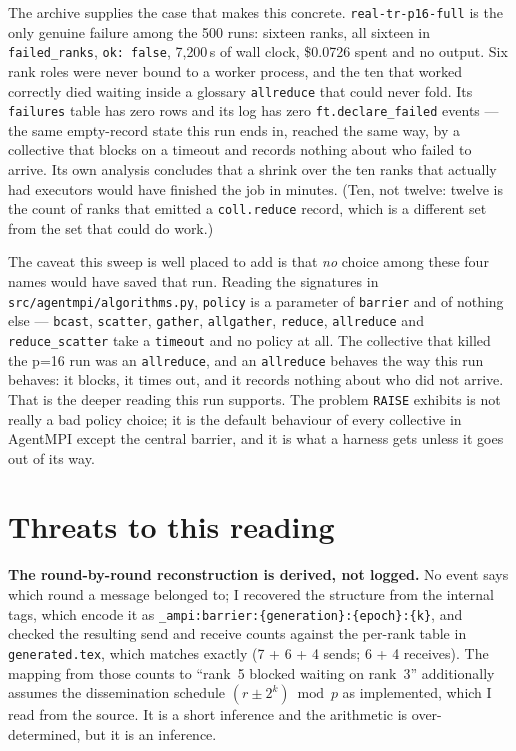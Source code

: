 \documentclass[11pt]{article}
\begin{document}
The archive supplies the case that makes this concrete. \texttt{real-tr-p16-full} is the
only genuine failure among the 500 runs: sixteen ranks, all sixteen in
\texttt{failed\_ranks}, \texttt{ok: false}, 7{,}200\,s of wall clock, \$0.0726 spent and
no output. Six rank roles were never bound to a worker process, and the ten that worked
correctly died waiting inside a glossary \texttt{allreduce} that could never fold. Its
\texttt{failures} table has zero rows and its log has zero \texttt{ft.declare\_failed}
events --- the same empty-record state this run ends in, reached the same way, by a
collective that blocks on a timeout and records nothing about who failed to arrive. Its
own analysis concludes that a shrink over the ten ranks that actually had executors would
have finished the job in minutes. (Ten, not twelve: twelve is the count of ranks that
emitted a \texttt{coll.reduce} record, which is a different set from the set that could do
work.)

The caveat this sweep is well placed to add is that \emph{no} choice among these four
names would have saved that run. Reading the signatures in
\texttt{src/agentmpi/algorithms.py}, \texttt{policy} is a parameter of \texttt{barrier}
and of nothing else --- \texttt{bcast}, \texttt{scatter}, \texttt{gather},
\texttt{allgather}, \texttt{reduce}, \texttt{allreduce} and \texttt{reduce\_scatter} take
a \texttt{timeout} and no policy at all. The collective that killed the p=16 run was an
\texttt{allreduce}, and an \texttt{allreduce} behaves the way this run behaves: it blocks,
it times out, and it records nothing about who did not arrive. That is the deeper reading
this run supports. The problem \texttt{RAISE} exhibits is not really a bad policy choice;
it is the default behaviour of every collective in AgentMPI except the central barrier,
and it is what a harness gets unless it goes out of its way.

\section{Threats to this reading}

\textbf{The round-by-round reconstruction is derived, not logged.} No event says which
round a message belonged to; I recovered the structure from the internal tags, which
encode it as \texttt{\_ampi:barrier:\{generation\}:\{epoch\}:\{k\}}, and checked the
resulting send and receive counts against the per-rank table in \texttt{generated.tex},
which matches exactly (7 + 6 + 4 sends; 6 + 4 receives). The mapping from those counts to
``rank~5 blocked waiting on rank~3'' additionally assumes the dissemination schedule
$(r \pm 2^k) \bmod p$ as implemented, which I read from the source. It is a short
inference and the arithmetic is over-determined, but it is an inference.
\end{document}
